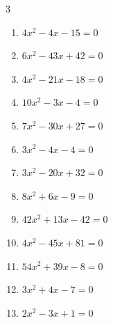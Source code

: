 \begin{multicols}{3}
\begin{enumerate}
  \item $4x^{2}-4x-15=0$


  \item $6x^{2}-43x+42=0$


  \item $4x^{2}-21x-18=0$


\columnbreak %

  \item $10x^{2}-3x-4=0$


  \item $7x^{2}-30x+27=0$


  \item $3x^{2}-4x-4=0$


  \item $3x^{2}-20x+32=0$


  \item $8x^{2}+6x-9=0$


  \item $42x^{2}+13x-42=0$


  \item $4x^{2}-45x+81=0$


  \item $54x^{2}+39x-8=0$


  \item $3x^{2}+4x-7=0$


  \item $2x^{2}-3x+1=0$


\end{enumerate}
\end{multicols}
